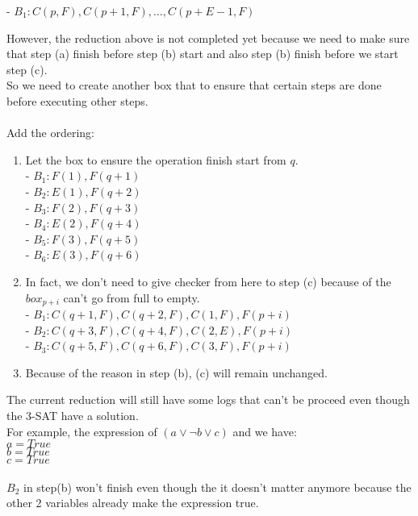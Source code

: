 \documentclass{article}
\begin{document}
\begin{enumerate}
{\begin{enumerate}
{					- $B_1: C(p, F), C(p + 1, F), \dots, C(p + E - 1, F)$\\
				}
			\end{enumerate}
			However, the reduction above is not completed yet because we need to make sure that step (a) finish before step (b) start and also step (b) finish before we start step (c).\\
			So we need to create another box that to ensure that certain steps are done before executing other steps. \\
			\\Add the ordering:
			\begin{enumerate}
				\item {
					Let the box to ensure the operation finish start from $q$.\\
					- $B_1: F(1), F(q + 1)$\\
					- $B_2: E(1), F(q + 2)$\\
					- $B_3: F(2), F(q + 3)$\\
					- $B_4: E(2), F(q + 4)$\\
					- $B_5: F(3), F(q + 5)$\\
					- $B_6: E(3), F(q + 6)$\\ 
				}
				\item{
					In fact, we don't need to give checker from here to step (c) because of the $box_{p+i}$ can't go from full to empty.\\
					- $B_1: C(q + 1, F), C(q + 2, F), C(1,F), F(p+i)$\\
					- $B_2: C(q + 3, F), C(q + 4, F), C(2,E), F(p+i)$\\
					- $B_3: C(q + 5, F), C(q + 6, F), C(3,F), F(p+i)$\\
				}
				\item{
					Because of the reason in step (b), (c) will remain unchanged.
				}
			\end{enumerate}
			\pagebreak
			The current reduction will still have some logs that can't be proceed even though the 3-SAT have a solution.\\
			For example, the expression of $(a \vee \neg b \vee c)$ and we have:\\
			$a = True$\\
			$b = True$\\
			$c = True$\\\\
			$B_2$ in step(b) won't finish even though the it doesn't matter anymore because the other 2 variables already make the expression true. \\
}
\end{enumerate}
\end{document}
